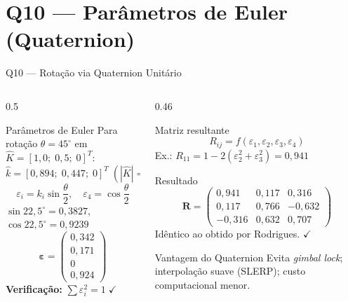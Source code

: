 \documentclass[aspectratio=169,12pt]{beamer}
\newcommand{\degr}{^{\circ}}
\newcommand{\mat}[1]{\begin{pmatrix}#1\end{pmatrix}}
\begin{document}
\section{Q10 --- Parâmetros de Euler (Quaternion)}

\begin{frame}{Q10 --- Rotação via Quaternion Unitário}
  \begin{columns}
    \begin{column}{0.5\textwidth}
      \begin{block}{Parâmetros de Euler}
        Para rotação $\theta=45\degr$ em $\hat{K}=[1{,}0;\;0{,}5;\;0]^T$:\\[4pt]
        $\hat{k}=[0{,}894;\;0{,}447;\;0]^T\;(|\hat{K}|=1{,}118)$\\[6pt]
        \[
          \varepsilon_i = k_i\sin\frac{\theta}{2},\quad \varepsilon_4=\cos\frac{\theta}{2}
        \]
        \small
        $\sin 22{,}5\degr = 0{,}3827$,\quad $\cos 22{,}5\degr = 0{,}9239$\\[4pt]
        \[
          \boldsymbol{\varepsilon} = \mat{0{,}342\\0{,}171\\0\\0{,}924}
        \]
        \textbf{Verificação:} $\sum\varepsilon_i^2 = 1\;\checkmark$
      \end{block}
    \end{column}
    \begin{column}{0.46\textwidth}
      \begin{block}{Matriz resultante}
        \small
        \[
          R_{ij} = f(\varepsilon_1,\varepsilon_2,\varepsilon_3,\varepsilon_4)
        \]
        Ex.: $R_{11}=1-2(\varepsilon_2^2+\varepsilon_3^2)=0{,}941$
      \end{block}
      \begin{exampleblock}{Resultado}
        \[
          \mathbf{R}=\mat{
            0{,}941 &  0{,}117 &  0{,}316\\
            0{,}117 &  0{,}766 & -0{,}632\\
           -0{,}316 &  0{,}632 &  0{,}707}
        \]
        \footnotesize Idêntico ao obtido por Rodrigues. $\checkmark$
      \end{exampleblock}
      \begin{alertblock}{Vantagem do Quaternion}
        Evita \emph{gimbal lock}; interpolação suave (SLERP); custo computacional menor.
      \end{alertblock}
    \end{column}
  \end{columns}
\end{frame}
\end{document}
